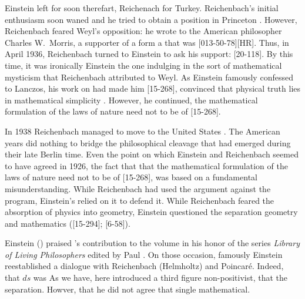 \documentclass[draft]{article}
\begin{document}
Einstein left for soon therefart, Reichenach for Turkey. Reichenbach's initial enthusiasm  soon waned and he tried to obtain a position in Princeton  \citep{Verhaegh2020a}. However, Reichenbach feared Weyl's opposition:  he wrote to the American philosopher Charles W.\ Morris, a supporter of a form a  that was  [013-50-78][HR]. Thus, in April 1936, Reichenbach turned to Einstein to ask his support:  [20-118]. By this time, it was ironically Einstein the one indulging in the sort of mathematical mysticism that Reichenbach attributed to Weyl. As Einstein famously confessed to Lanczos, his work on \gr had made him  [15-268], convinced that physical truth lies in mathematical simplicity \citep{Ryckman2014}. However, he continued, the mathematical formulation of the laws of nature need not to be of  [15-268]. 

In 1938 Reichenbach managed to move to the United States \citep{Verhaegh2020a}. The American years did nothing to bridge the philosophical cleavage that had emerged during their late Berlin time. Even the point on which Einstein and Reichenbach seemed to have agreed in 1926, the fact that that the mathematical formulation of the laws of nature need not to be of  [15-268], was based on a fundamental misunderstanding. While Reichenbach had used the argument against the \uft program, Einstein's relied on it to defend it. While Reichenbach feared the absorption of physics into geometry, Einstein questioned the separation geometry and mathematics ([15-294]; [6-58]).  

Einstein (\citeyear*{Einstein1949f,Einstein1949a}) praised ’s contribution to the volume in his honor of the series \textit{Library of Living Philosophers} edited by Paul \citet{Schilpp1949}. On those occasion, famously Einstein reestablished a dialogue with Reichenbach (Helmholtz) and Poincaré. Indeed, that $ds$ was As we have, here introduced a third figure non-positivist, that the separation. Howver, that he did not agree that single mathematical. 
\end{document}
